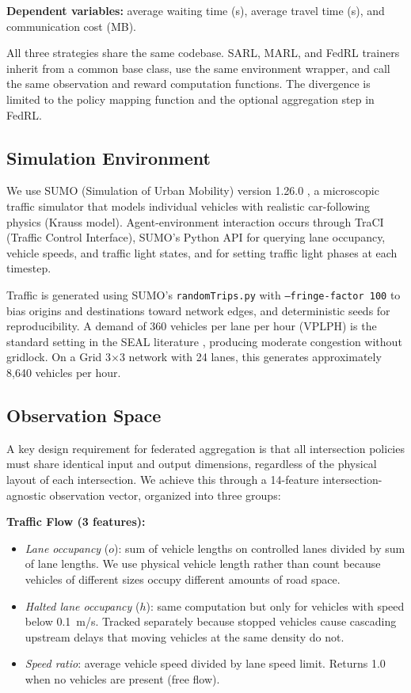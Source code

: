 \documentclass[conference]{IEEEtran}
\begin{document}
\textbf{Dependent variables:} average waiting time (s), average travel time (s), and communication cost (MB).

All three strategies share the same codebase. SARL, MARL, and FedRL trainers inherit from a common base class, use the same environment wrapper, and call the same observation and reward computation functions. The divergence is limited to the policy mapping function and the optional aggregation step in FedRL.

\subsection{Simulation Environment}

We use SUMO (Simulation of Urban Mobility) version 1.26.0 \cite{b_sumo}, a microscopic traffic simulator that models individual vehicles with realistic car-following physics (Krauss model). Agent-environment interaction occurs through TraCI (Traffic Control Interface), SUMO's Python API for querying lane occupancy, vehicle speeds, and traffic light states, and for setting traffic light phases at each timestep.

Traffic is generated using SUMO's \texttt{randomTrips.py} with \texttt{--fringe-factor 100} to bias origins and destinations toward network edges, and deterministic seeds for reproducibility. A demand of 360 vehicles per lane per hour (VPLPH) is the standard setting in the SEAL literature \cite{b_seal}, producing moderate congestion without gridlock. On a Grid 3$\times$3 network with 24 lanes, this generates approximately 8,640 vehicles per hour.

\subsection{Observation Space}

A key design requirement for federated aggregation is that all intersection policies must share identical input and output dimensions, regardless of the physical layout of each intersection. We achieve this through a 14-feature intersection-agnostic observation vector, organized into three groups:

\textbf{Traffic Flow (3 features):}
\begin{itemize}
    \item \textit{Lane occupancy} ($o$): sum of vehicle lengths on controlled lanes divided by sum of lane lengths. We use physical vehicle length rather than count because vehicles of different sizes occupy different amounts of road space.
    \item \textit{Halted lane occupancy} ($h$): same computation but only for vehicles with speed below 0.1~m/s. Tracked separately because stopped vehicles cause cascading upstream delays that moving vehicles at the same density do not.
    \item \textit{Speed ratio}: average vehicle speed divided by lane speed limit. Returns 1.0 when no vehicles are present (free flow).
\end{itemize}
\end{document}
